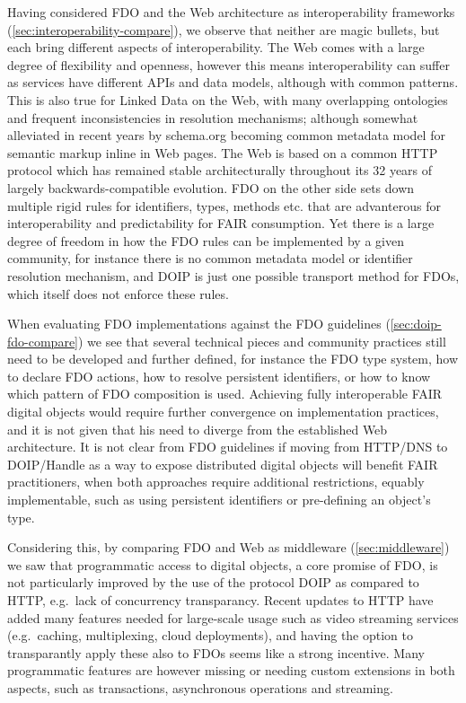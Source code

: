 Having considered FDO and the Web architecture as interoperability
frameworks
(\protect\hyperlink{sec:interoperability-compare}{{[}sec:interoperability-compare{]}}), we observe that neither are
magic bullets, but each bring different aspects of interoperability. The
Web comes with a large degree of flexibility and openness, however this
means interoperability can suffer as services have different APIs and
data models, although with common patterns. This is also true for Linked
Data on the Web, with many overlapping ontologies and frequent
inconsistencies in resolution mechanisms; although somewhat alleviated
in recent years by schema.org becoming common metadata model for
semantic markup inline in Web pages. The Web is based on a common HTTP
protocol which has remained stable architecturally throughout its 32
years of largely backwards-compatible evolution. FDO on the other side
sets down multiple rigid rules for identifiers, types, methods etc. that
are advanterous for interoperability and predictability for FAIR
consumption. Yet there is a large degree of freedom in how the FDO rules
can be implemented by a given community, for instance there is no common
metadata model or identifier resolution mechanism, and DOIP is just one
possible transport method for FDOs, which itself does not enforce these
rules.

When evaluating FDO implementations against the FDO guidelines
(\protect\hyperlink{sec:doip-fdo-compare}{{[}sec:doip-fdo-compare{]}}) we see that several technical pieces
and community practices still need to be developed and further defined,
for instance the FDO type system, how to declare FDO actions, how to
resolve persistent identifiers, or how to know which pattern of FDO
composition is used. Achieving fully interoperable FAIR digital objects
would require further convergence on implementation practices, and it is
not given that his need to diverge from the established Web
architecture. It is not clear from FDO guidelines if moving from
HTTP/DNS to DOIP/Handle as a way to expose distributed digital objects
will benefit FAIR practitioners, when both approaches require additional
restrictions, equably implementable, such as using persistent
identifiers or pre-defining an object's type.

Considering this, by comparing FDO and Web as middleware
(\protect\hyperlink{sec:middleware}{{[}sec:middleware{]}}) we saw that programmatic access to digital
objects, a core promise of FDO, is not particularly improved by the use
of the protocol DOIP as compared to HTTP, e.g.~lack of concurrency
transparancy. Recent updates to HTTP have added many features needed for
large-scale usage such as video streaming services (e.g.~caching,
multiplexing, cloud deployments), and having the option to transparantly
apply these also to FDOs seems like a strong incentive. Many
programmatic features are however missing or needing custom extensions
in both aspects, such as transactions, asynchronous operations and
streaming.

